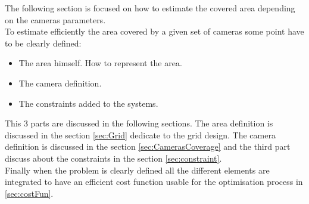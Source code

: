 

The following section is focused on how to estimate the covered area depending on the cameras parameters.\\






To estimate efficiently the area covered by a given set of cameras some point have to be clearly defined: 
\begin{itemize}
\item The area himself. How to represent the area. 
\item The camera definition. 
\item The constraints added to the systems. \\
\end{itemize} 
 This 3 parts are discussed in the following sections. The area definition is discussed in the section \ref{sec:Grid} dedicate to the grid design. The camera definition is discussed in the section \ref{sec:CamerasCoverage} and the third part discuss about the constraints in the section \ref{sec:constraint}.\\
Finally when the problem is clearly defined all the different elements are integrated to have an efficient cost function usable for the optimisation process in \ref{sec:costFun}.

